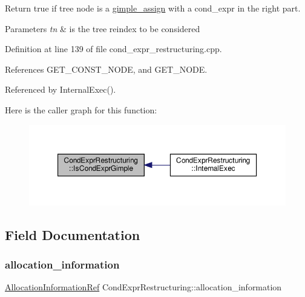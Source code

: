 Return true if tree node is a \hyperlink{structgimple__assign}{gimple\+\_\+assign} with a cond\+\_\+expr in the right part. 


\begin{DoxyParams}{Parameters}
{\em tn} & is the tree reindex to be considered \\
\hline
\end{DoxyParams}


Definition at line 139 of file cond\+\_\+expr\+\_\+restructuring.\+cpp.



References G\+E\+T\+\_\+\+C\+O\+N\+S\+T\+\_\+\+N\+O\+DE, and G\+E\+T\+\_\+\+N\+O\+DE.



Referenced by Internal\+Exec().

Here is the caller graph for this function\+:
\nopagebreak
\begin{figure}[H]
\begin{center}
\leavevmode
\includegraphics[width=350pt]{dd/d33/classCondExprRestructuring_ac55548adeb0d01cba83cfe39a2e5e17d_icgraph}
\end{center}
\end{figure}


\subsection{Field Documentation}
\mbox{\label{classCondExprRestructuring_abe9639124e1e791eca3ae62fb88ed410}} 
\subsubsection{\texorpdfstring{allocation\+\_\+information}{allocation\_information}}
{\footnotesize\ttfamily \hyperlink{allocation__information_8hpp_ad90a86da153cba50cbcefc4679036755}{Allocation\+Information\+Ref} Cond\+Expr\+Restructuring\+::allocation\+\_\+information\hspace{0.3cm}{\ttfamily [private]}}



